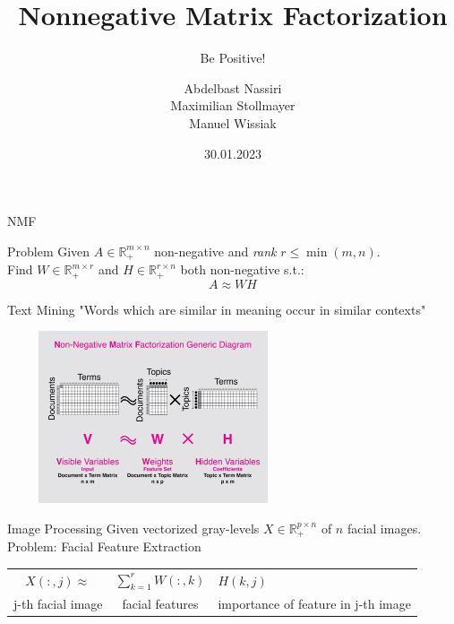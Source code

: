 \documentclass[aspectratio=169]{beamer}
\title{Nonnegative Matrix Factorization}
\subtitle{Be Positive!}
\author{Abdelbast Nassiri \\ Maximilian Stollmayer \\ Manuel Wissiak}
\institute{University of Vienna}
\date{30.01.2023}
\begin{document}
\titleframe


\begin{frame}{NMF}
    \begin{block}{Problem}
        Given \(A \in \mathbb{R}^{m \times n}_+\) non-negative and \emph{rank} \(r \leq \min(m, n)\). \\
        Find \(W \in \mathbb{R}^{m \times r}_+\) and \(H \in \mathbb{R}^{r \times n}_+\) both non-negative s.t.: \\
        \[A \approx WH\]
    \end{block}
\end{frame}

\begin{frame}{Text Mining}
    "Words which are similar in meaning occur in similar contexts"
    \begin{center}
    \includegraphics[height = 2in, width = 3.4in]{textmine.png} \\
    \end{center}
\end{frame}

\begin{frame}{Image Processing}
    Given vectorized gray-levels \(X \in \mathbb{R}^{p \times n}_+\) of $n$ facial images. \\
    Problem: Facial Feature Extraction
    \begin{center}
    \begin{tabular}{ c c l }
     \(X(:,j) \approx \) &  \(\sum_{k=1}^{r} W(:,k) \) & \(H(k,j)\) \\ 
     j-th facial image & facial features & importance of feature in j-th image 
    \end{tabular}
    \end{center}
     
\end{frame}
\end{document}
